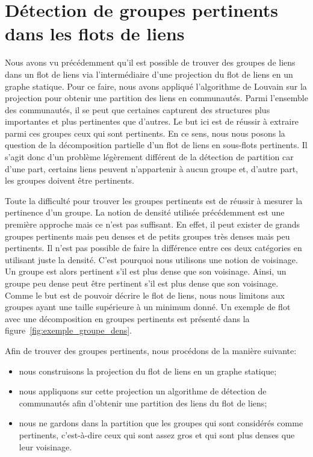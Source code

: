 \chapter{Détection de groupes pertinents dans les flots de liens}
\minitoc

\label{groupesDense}
Nous avons vu précédemment qu'il est possible de trouver des groupes de liens dans un flot de liens via l'intermédiaire d'une projection du flot de liens en un graphe statique.
Pour ce faire, nous avons appliqué l'algorithme de Louvain sur la projection pour obtenir une partition des liens en communautés.
Parmi l'ensemble des communautés, il se peut que certaines capturent des structures plus importantes et plus pertinentes que d'autres.
Le but ici est de réussir à extraire parmi ces groupes ceux qui sont pertinents.
En ce sens, nous nous posons la question de la décomposition partielle d'un flot de liens en sous-flots pertinents.
Il s'agit donc d'un problème légèrement différent de la détection de partition car d'une part, certains liens peuvent n'appartenir à aucun groupe et, d'autre part, les groupes doivent être pertinents.

Toute la difficulté pour trouver les groupes pertinents est de réussir à mesurer la pertinence d'un groupe.
La notion de densité utilisée précédemment est une première approche mais ce n'est pas suffisant.
En effet, il peut exister de grands groupes pertinents mais peu denses et de petits groupes très denses mais peu pertinents.
Il n'est pas possible de faire la différence entre ces deux catégories en utilisant juste la densité.
C'est pourquoi nous utilisons une notion de voisinage.
Un groupe est alors pertinent s'il est plus dense que son voisinage.
Ainsi, un groupe peu dense peut être pertinent s'il est plus dense que son voisinage.
Comme le but est de pouvoir décrire le flot de liens, nous nous limitons aux groupes ayant une taille supérieure à un minimum donné.
Un exemple de flot avec une décomposition en groupes pertinents est présenté dans la figure~\ref{fig:exemple_groupe_dens}.

Afin de trouver des groupes pertinents, nous procédons de la manière suivante:
\begin{itemize}
\item nous construisons la projection du flot de liens en un graphe statique;
\item nous appliquons sur cette projection un algorithme de détection de communautés afin d'obtenir une partition des liens du flot de liens;
\item nous ne gardons dans la partition que les groupes qui sont considérés comme pertinents, c'est-à-dire ceux qui sont assez gros et qui sont plus denses que leur voisinage.
\end{itemize}

